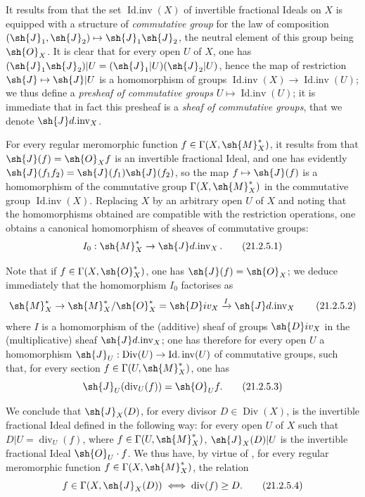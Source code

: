 \begin{env}[21.2.4]
\label{IV.21.2.4}
It results from  that the set $\operatorname{Id.inv}(X)$ of invertible fractional Ideals on $X$ is equipped with a structure of \emph{commutative group} for the law of composition $(\sh{J}_1,\sh{J}_2)\mapsto\sh{J}_1\sh{J}_2$, the neutral element of this group being $\sh{O}_X$.
It is clear that for every open $U$ of $X$, one has $(\sh{J}_1\sh{J}_2)|U=(\sh{J}_1|U)(\sh{J}_2|U)$, hence the map of restriction $\sh{J}\mapsto\sh{J}|U$ is a homomorphism of groups $\operatorname{Id.inv}(X)\to\operatorname{Id.inv}(U)$;
we thus define a \emph{presheaf of commutative groups} $U\mapsto\operatorname{Id.inv}(U)$;
it is immediate that in fact this presheaf is a \emph{sheaf of commutative groups}, that we denote $\sh{J}d.\!\operatorname{inv}_X$.
\end{env}

\begin{env}[21.2.5]
\label{IV.21.2.5}
For every regular meromorphic function $f\in\Gamma(X,\sh{M}_X^*)$, it results from  that $\sh{J}(f)=\sh{O}_X f$ is an invertible fractional Ideal, and one has evidently $\sh{J}(f_1 f_2)=\sh{J}(f_1)\sh{J}(f_2)$, so the map $f\mapsto\sh{J}(f)$ is a homomorphism of the commutative group $\Gamma(X,\sh{M}_X^*)$ in the commutative group $\operatorname{Id.inv}(X)$.
Replacing $X$ by an arbitrary open $U$ of $X$ and noting that the homomorphisms obtained are compatible with the restriction operations, one obtains a canonical homomorphism of sheaves of commutative groups:
\[
\label{IV.21.2.5.1}
  I_0:\sh{M}_X^*\to\sh{J}d.\!\operatorname{inv}_X.
  \tag{21.2.5.1}
\]

Note that if $f\in\Gamma(X,\sh{O}_X^*)$, one has $\sh{J}(f)=\sh{O}_X$;
we deduce immediately that the homomorphism $I_0$ factorises as
\[
\label{IV.21.2.5.2}
  \sh{M}_X^*\to\sh{M}_X^*/\sh{O}_X^*=\sh{D}iv_X\xrightarrow{I}\sh{J}d.\!\operatorname{inv}_X
  \tag{21.2.5.2}
\]
where $I$ is a homomorphism of the (additive) sheaf of groups $\sh{D}iv_X$ in the (multiplicative) sheaf $\sh{J}d.\!\operatorname{inv}_X$;
one has therefore for every open $U$ a homomorphism $\sh{J}_U:\operatorname{Div}(U)\to\operatorname{Id.inv}(U)$ of commutative groups, such that, for every section $f\in\Gamma(U,\sh{M}_X^*)$, one has
\[
\label{IV.21.2.5.3}
  \sh{J}_U(\operatorname{div}_U(f))=\sh{O}_U f.
  \tag{21.2.5.3}
\]

We conclude that $\sh{J}_X(D)$, for every divisor $D\in\operatorname{Div}(X)$, is the invertible fractional Ideal defined in the following way: for every open $U$ of $X$ such that $D|U=\operatorname{div}_U(f)$, where $f\in\Gamma(U,\sh{M}_X^*)$, $\sh{J}_X(D)|U$ is the invertible fractional Ideal $\sh{O}_U\cdot f$.
We thus have, by virtue of , for every regular meromorphic function $f\in\Gamma(X,\sh{M}_X^*)$, the relation
\[
\label{IV.21.2.5.4}
  f\in\Gamma(X,\sh{J}_X(D))\iff\operatorname{div}(f)\geq D.
  \tag{21.2.5.4}
\]
\end{env}


